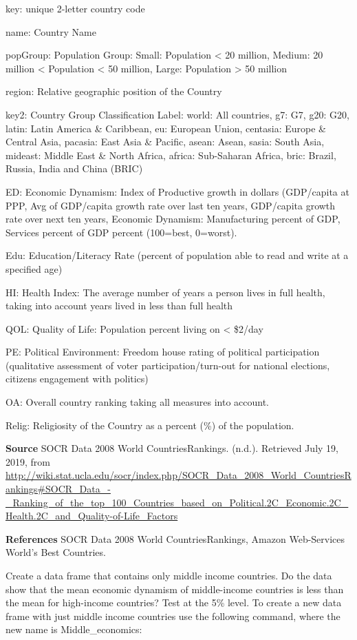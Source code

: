 \documentclass[
]{book}
\begin{document}
key: unique 2-letter country code

name: Country Name

popGroup: Population Group: Small: Population \textless{} 20 million, Medium: 20 million \textless{} Population \textless{} 50 million, Large: Population \textgreater{} 50 million

region: Relative geographic position of the Country

key2: Country Group Classification Label: world: All countries, g7: G7, g20: G20, latin: Latin America \& Caribbean, eu: European Union, centasia: Europe \& Central Asia, pacasia: East Asia \& Pacific, asean: Asean, sasia: South Asia, mideast: Middle East \& North Africa, africa: Sub-Saharan Africa, bric: Brazil, Russia, India and China (BRIC)

ED: Economic Dynamism: Index of Productive growth in dollars (GDP/capita at PPP, Avg of GDP/capita growth rate over last ten years, GDP/capita growth rate over next ten years, Economic Dynamism: Manufacturing percent of GDP, Services percent of GDP percent (100=best, 0=worst).

Edu: Education/Literacy Rate (percent of population able to read and write at a specified age)

HI: Health Index: The average number of years a person lives in full health, taking into account years lived in less than full health

QOL: Quality of Life: Population percent living on \textless{} \$2/day

PE: Political Environment: Freedom house rating of political participation (qualitative assessment of voter participation/turn-out for national elections, citizens engagement with politics)

OA: Overall country ranking taking all measures into account.

Relig: Religiosity of the Country as a percent (\%) of the population.

\textbf{Source}
SOCR Data 2008 World CountriesRankings. (n.d.). Retrieved July 19, 2019, from \url{http://wiki.stat.ucla.edu/socr/index.php/SOCR_Data_2008_World_CountriesRankings\#SOCR_Data_-_Ranking_of_the_top_100_Countries_based_on_Political.2C_Economic.2C_Health.2C_and_Quality-of-Life_Factors}

\textbf{References}
SOCR Data 2008 World CountriesRankings, Amazon Web-Services World's Best Countries.

Create a data frame that contains only middle income countries. Do the data show that the mean economic dynamism of middle-income countries is less than the mean for high-income countries? Test at the 5\% level. To create a new data frame with just middle income countries use the following command, where the new name is Middle\_economics:
\end{document}
